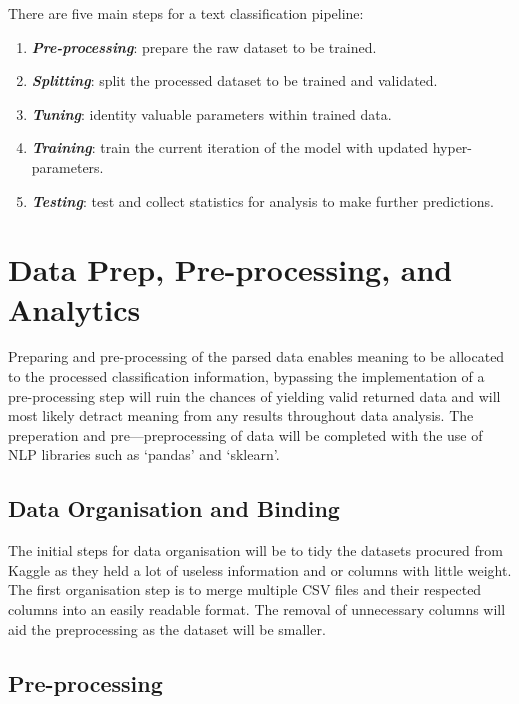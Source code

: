 There are five main steps for a text classification pipeline:

\begin{enumerate}
    \item \textbf{\textit{Pre-processing}}: prepare the raw dataset to be trained.
    \item \textbf{\textit{Splitting}}: split the processed dataset to be trained and validated.
    \item \textbf{\textit{Tuning}}: identity valuable parameters within trained data.
    \item \textbf{\textit{Training}}: train the current iteration of the model with updated hyper-parameters.
    \item \textbf{\textit{Testing}}: test and collect statistics for analysis to make further predictions.
\end{enumerate} \newpage

\section{Data Prep, Pre-processing, and Analytics}

Preparing and pre-processing of the parsed data enables meaning to be allocated to the processed classification information, bypassing the implementation of a pre-processing step will ruin the chances of yielding valid returned data and will most likely detract meaning from any results throughout data analysis. The preperation and pre---preprocessing of data will be completed with the use of NLP libraries such as `pandas' and `sklearn'.

\subsection{Data Organisation and Binding}

The initial steps for data organisation will be to tidy the datasets procured from Kaggle as they held a lot of useless information and or columns with little weight. The first organisation step is to merge multiple CSV files and their respected columns into an easily readable format. The removal of unnecessary columns will aid the preprocessing as the dataset will be smaller.

\subsection{Pre-processing} \label{sub:C5Preprocessing}

